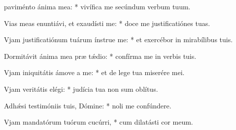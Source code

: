 \begin{psalmus}

 paviménto ánima mea: * vivífica me secúndum verbum tuum.

Vias meas enuntiávi, et exaudísti me: * doce me justificatiónes tuas.

Vjam justificatiónum tuárum ínstrue me: * et exercébor in mirabílibus tuis.

Dormitávit ánima mea præ tǽdio: * confírma me in verbis tuis.

Vjam iniquitátis ámove a me: * et de lege tua miserére mei.

Vjam veritátis elégi: * judícia tua non sum oblítus.

Adhǽsi testimóniis tuis, Dómine: * noli me confúndere.

Vjam mandatórum tuórum cucúrri, * cum dilatásti cor meum.

\end{psalmus}
